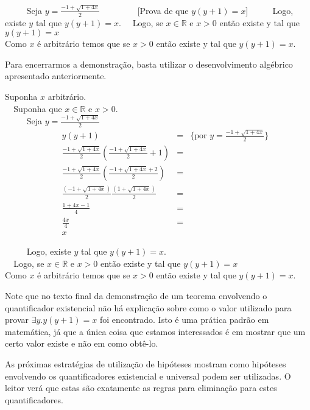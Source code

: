 \begin{Example}
\begin{flushleft}
\verb|     |Seja $y = \frac{-1 + \sqrt{1 + 4x}}{2}$
\verb|        |[Prova de que $y(y+1) = x$]
\verb|     |Logo, existe $y$ tal que $y(y+1) = x$.
\verb|  |Logo, se $x \in \mathbb{R}$ e $x> 0$ então existe y tal que
$y(y+1) = x$\\
Como $x$ é arbitrário temos que se $x > 0$ então existe y tal que
$y(y+1) = x$.
\end{flushleft}
Para encerrarmos a demonstração, basta utilizar o desenvolvimento
algébrico apresentado anteriormente.
\begin{flushleft}
Suponha $x$ arbitrário.\\
\verb|  |Suponha que $x \in \mathbb{R}$ e $x> 0$.\\
\verb|     |Seja $y = \frac{-1 + \sqrt{1 + 4x}}{2}$\\
\[
\begin{array}{llcl}
\,\,\,\,\,& y(y+1) & = &\{\text{por }y = \frac{-1 + \sqrt{1 + 4x}}{2}\}\\
 &\frac{-1 + \sqrt{1 + 4x}}{2}\left(\frac{-1 + \sqrt{1 + 4x}}{2} +
  1\right) & = &\\
& \frac{-1 + \sqrt{1 + 4x}}{2}\left(\frac{-1 + \sqrt{1 + 4x} + 2}{2}
\right) & = \\
& \frac{(-1 + \sqrt{1 + 4x})}{2}\frac{(1 + \sqrt{1 + 4x})}{2} & =\\
& \frac{1 + 4x - 1}{4} & =\\
& \frac{4x}{4} & = \\
& x
\end{array}
\]

\verb|     |Logo, existe $y$ tal que $y(y+1) = x$.\\
\verb|  |Logo, se $x \in \mathbb{R}$ e $x> 0$ então existe y tal que
$y(y+1) = x$\\
Como $x$ é arbitrário temos que se $x > 0$ então existe y tal que
$y(y+1) = x$.
\end{flushleft}
\end{Example}

Note que no texto final da demonstração de um teorema envolvendo o
quantificador existencial não há explicação sobre como o valor
utilizado para provar $\exists y. y (y + 1) = x$ foi encontrado. Isto
é uma prática padrão em matemática, já que a única coisa que estamos
interessados é em mostrar que um certo valor existe e não em como
obtê-lo.

As próximas estratégias de utilização de hipóteses mostram como
hipóteses envolvendo os quantificadores existencial e universal podem
ser utilizadas. O leitor verá que estas são exatamente as regras para
eliminação para estes quantificadores.

